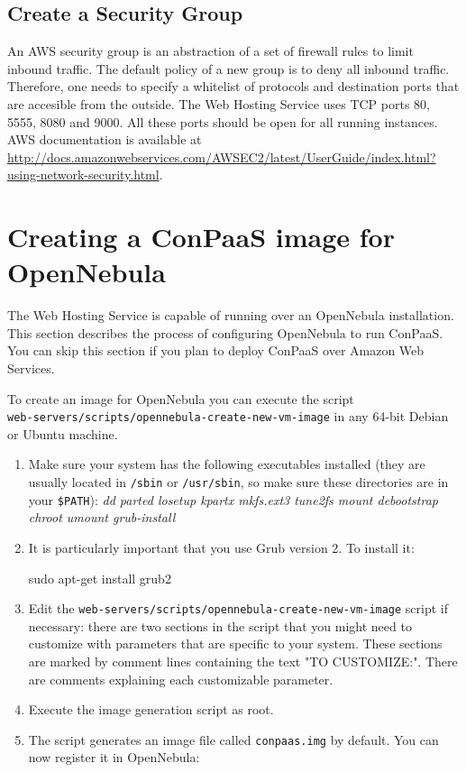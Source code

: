 \documentclass[10pt]{article}
\begin{document}
\subsection{Create a Security Group}

An AWS security group is an abstraction of a set of firewall rules to
limit inbound traffic. The default policy of a new group is to deny
all inbound traffic. Therefore, one needs to specify a whitelist of
protocols and destination ports that are accesible from the outside.
The Web Hosting Service uses TCP ports 80, 5555, 8080 and 9000. All
these ports should be open for all running instances.  AWS
documentation is available at
\url{http://docs.amazonwebservices.com/AWSEC2/latest/UserGuide/index.html?using-network-security.html}.

\section{Creating a ConPaaS image for OpenNebula}
\label{sec:oneimage}

The Web Hosting Service is capable of running over an OpenNebula
installation. This section describes the process of configuring
OpenNebula to run ConPaaS. You can skip this section if you plan to
deploy ConPaaS over Amazon Web Services.

To create an image for OpenNebula you can execute the script\\
\verb+web-servers/scripts/opennebula-create-new-vm-image+ in any
64-bit Debian or Ubuntu machine.

\begin{enumerate}
\item Make sure your system has the following executables installed
  (they are usually located in \verb+/sbin+ or \verb+/usr/sbin+, so
  make sure these directories are in your \verb+$PATH+): %
  \emph{dd parted losetup kpartx mkfs.ext3 tune2fs mount debootstrap
    chroot umount grub-install}
\item It is particularly important that you use Grub version 2. To
  install it:
  \begin{code}
  sudo apt-get install grub2
  \end{code}
\item Edit the
  \verb+web-servers/scripts/opennebula-create-new-vm-image+ script
  if necessary: there are two sections in the script that you might need
  to customize with parameters that are specific to your system. These
  sections are marked by comment lines containing the text "TO CUSTOMIZE:".
  There are comments explaining each customizable parameter. 
\item Execute the image generation script as root.
\item The script generates an image file called \verb+conpaas.img+
  by default. You can now register it in OpenNebula:
\end{enumerate}
\end{document}
